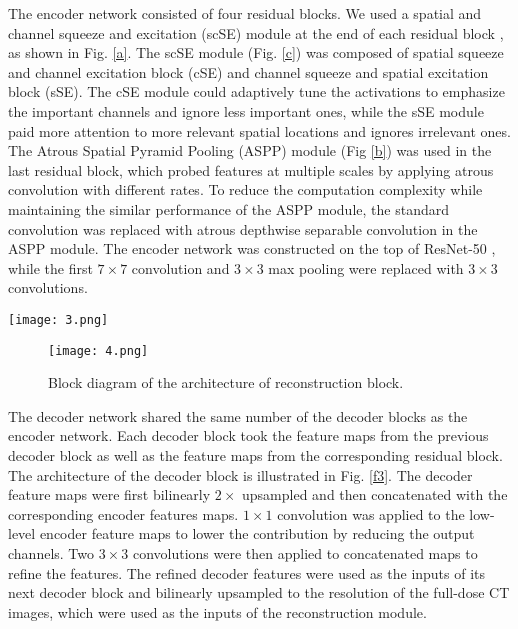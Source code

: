 \documentclass[conference]{IEEEtran}
\begin{document}
The encoder network consisted of four residual blocks. We used a spatial and channel squeeze and excitation (scSE) module \cite{roy2018concurrent} at the end of each residual block \cite{He2016Deep}, as shown in Fig. \ref{a}. The scSE module (Fig. \ref{c}) was composed of spatial squeeze and channel excitation block (cSE) \cite{Hu2017Squeeze} and channel squeeze and spatial excitation block (sSE). The cSE module could adaptively tune the activations to emphasize the important channels and ignore less important ones, while the sSE module paid more attention to more relevant spatial locations and ignores irrelevant ones. The Atrous Spatial Pyramid Pooling (ASPP) module (Fig \ref{b}) \cite{Chen2017Rethinking} was used in the last residual block, which probed features at multiple scales by applying atrous convolution with different rates. To reduce the computation complexity while maintaining the similar performance of the ASPP module, the standard convolution  was replaced with atrous depthwise separable convolution \cite{Howard2017MobileNets,Zhang2017ShuffleNet,Chen2017Deeplab} in the ASPP module. The encoder network was constructed on the top of ResNet-50 \cite{He2016Deep}, while the first $7\times7$ convolution and $3\times3$ max pooling were replaced with $3\times3$ convolutions.

\begin{figure*}[!t]
\centering
\texttt{[image: 3.png]}
\caption{Block diagram of the architecture of decoder block.}
\label{f3}
\end{figure*}

\begin{figure}[!t]
\centering
\texttt{[image: 4.png]}
\caption{Block diagram of the architecture of reconstruction block.}
\label{f4}
\end{figure}

The decoder network shared the same number of the decoder blocks as the encoder network. Each decoder block took the feature maps from the previous decoder block as well as the feature maps from the corresponding residual block. The architecture of the decoder block is illustrated in Fig. \ref{f3}. The decoder feature maps were first bilinearly $2\times$ upsampled and then concatenated with the corresponding encoder features maps. $1\times 1$ convolution was applied to the low-level encoder feature maps to lower the contribution by reducing the output channels. Two $3\times 3$ convolutions were then applied to concatenated maps to refine the features. The refined decoder features were used as the inputs of its next decoder block and bilinearly upsampled to the resolution of the full-dose CT images, which were used as the inputs of the reconstruction module.
\end{document}
